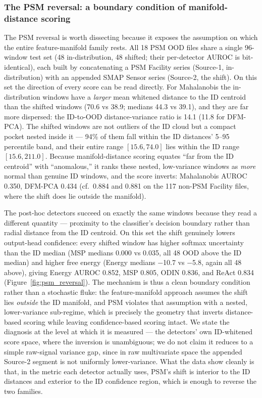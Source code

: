 \subsubsection{The PSM reversal: a boundary condition of manifold-distance
scoring}\label{sec:results-psm-boundary}
The PSM reversal is worth dissecting because it exposes the assumption on which
the entire feature-manifold family rests. All \num{18} PSM OOD files share a
single \num{96}-window test set (\num{48} in-distribution, \num{48} shifted;
their per-detector AUROC is bit-identical), each built by concatenating a PSM
Facility series (Source-1, in-distribution) with an appended SMAP Sensor series
(Source-2, the shift). On this set the direction of every score can be read
directly. For Mahalanobis the in-distribution windows have a \emph{larger} mean
whitened distance to the ID centroid than the shifted windows
(\num{70.6} vs \num{38.9}; medians \num{44.3} vs \num{39.1}), and they are far
more dispersed: the ID-to-OOD distance-variance ratio is \num{14.1}
(\num{11.8} for DFM-PCA). The shifted windows are not outliers of the ID cloud
but a compact pocket nested inside it --- \num{94}\% of them fall within the ID
distances' \numrange{5}{95} percentile band, and their entire range
$[\num{15.6},\num{74.0}]$ lies within the ID range $[\num{15.6},\num{211.0}]$.
Because manifold-distance scoring equates ``far from the ID centroid'' with
``anomalous,'' it ranks these nested, low-variance windows as \emph{more} normal
than genuine ID windows, and the score inverts: Mahalanobis AUROC \num{0.350},
DFM-PCA \num{0.434} (cf.\ \num{0.884} and \num{0.881} on the \num{117} non-PSM
Facility files, where the shift does lie outside the manifold).

The post-hoc detectors succeed on exactly the same windows because they read a
different quantity --- proximity to the classifier's decision boundary rather
than radial distance from the ID centroid. On this set the shift genuinely
lowers output-head confidence: every shifted window has higher softmax
uncertainty than the ID median (MSP medians \num{0.000} vs \num{0.035}, all
\num{48} OOD above the ID median) and higher free energy (Energy medians
\num{-10.7} vs \num{-5.8}, again all \num{48} above), giving Energy AUROC
\num{0.852}, MSP \num{0.805}, ODIN \num{0.836}, and ReAct \num{0.834}
(Figure~\ref{fig:psm_reversal}). The mechanism is thus a clean boundary
condition rather than a stochastic fluke: the feature-manifold approach assumes
the shift lies \emph{outside} the ID manifold, and PSM violates that assumption
with a nested, lower-variance sub-regime, which is precisely the geometry that
inverts distance-based scoring while leaving confidence-based scoring intact. We
state the diagnosis at the level at which it is measured --- the detectors' own
ID-whitened score space, where the inversion is unambiguous; we do not claim it
reduces to a simple raw-signal variance gap, since in raw multivariate space the
appended Source-2 segment is not uniformly lower-variance. What the data show
cleanly is that, in the metric each detector actually uses, PSM's shift is
interior to the ID distances and exterior to the ID confidence region, which is
enough to reverse the two families.

